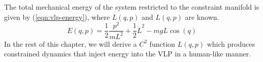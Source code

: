 The total mechanical energy of the system restricted to the constraint manifold
is given by (\ref{eqn:vlp-energy}), where \(L(q,p)\) and \(\dot{L}(q,p)\) are
known.
\begin{equation}\label{eqn:vlp-energy}
   E(q,p) = \frac{1}{2} \frac{p^2}{mL^2} + \frac{1}{2}\dot{L}^2 - mgL\cos(q)
\end{equation}
In the rest of this chapter, we will derive a \(C^2\) function \(L(q,p)\) 
which produces constrained dynamics that inject energy into the VLP in a
human-like manner.


